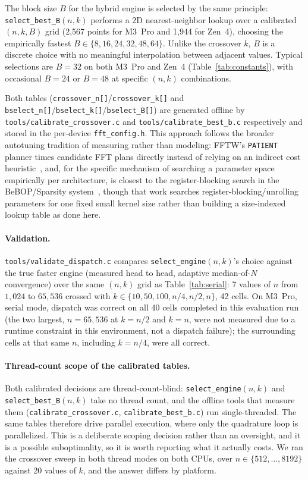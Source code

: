 \documentclass[11pt]{article}
\begin{document}
The block size $B$ for the hybrid engine is selected by the same principle:
\texttt{select\_best\_B}$(n,k)$ performs a 2D nearest-neighbor lookup over
a calibrated $(n,k,B)$ grid (2,567 points for M3~Pro and 1,944 for Zen~4), choosing the
empirically fastest $B \in \{8, 16, 24, 32, 48, 64\}$.  Unlike the
crossover $k$, $B$ is a discrete choice with no meaningful interpolation
between adjacent values.  Typical selections are $B = 32$ on both M3~Pro
and Zen~4 (Table~\ref{tab:constants}), with occasional $B = 24$ or $B = 48$ at specific $(n,k)$
combinations.

Both tables (\texttt{crossover\_n[]}/\texttt{crossover\_k[]} and
\texttt{bselect\_n[]}/\texttt{bselect\_k[]}/\texttt{bselect\_B[]}) are
generated offline by \texttt{tools/calibrate\_crossover.c} and
\texttt{tools/calibrate\_best\_b.c} respectively and stored in the
per-device \texttt{fft\_config.h}.  This approach follows the broader
autotuning tradition of measuring rather than modeling: FFTW's
\texttt{PATIENT} planner times candidate FFT plans directly instead of
relying on an indirect cost heuristic~\citep{frigo2005}, and, for the
specific mechanism of searching a parameter space empirically per
architecture, is closest to the register-blocking search in the
BeBOP/Sparsity system~\citep{demmel2004}, though that work searches
register-blocking/unrolling parameters for one fixed small kernel size
rather than building a size-indexed lookup table as done here.

\paragraph{Validation.}
\texttt{tools/validate\_dispatch.c} compares
\texttt{select\_engine}\allowbreak$(n,k)$'s choice against the true faster engine
(measured head to head, adaptive median-of-$N$ convergence) over the same
$(n,k)$ grid as Table~\ref{tab:serial}: 7 values of $n$ from $1{,}024$
to $65{,}536$ crossed with $k \in \{10, 50, 100, n/4, n/2, n\}$, 42 cells.
On M3~Pro, serial mode, dispatch was correct on all 40 cells completed in
this evaluation run (the two largest, $n=65{,}536$ at $k=n/2$ and $k=n$,
were not measured due to a runtime constraint in this environment, not a
dispatch failure); the surrounding cells at that same $n$, including
$k=n/4$, were all correct.

\paragraph{Thread-count scope of the calibrated tables.}
Both calibrated decisions are thread-count-blind:
\texttt{select\_engine}\allowbreak$(n,k)$ and
\texttt{select\_best\_B}\allowbreak$(n,k)$ take no thread count, and the
offline tools that measure them (\texttt{calibrate\_crossover.c},
\texttt{calibrate\_best\_b.c}) run single-threaded. The same tables
therefore drive parallel execution, where only the quadrature loop is
parallelized. This is a deliberate scoping decision rather than an
oversight, and it is a possible suboptimality, so it is worth reporting
what it actually costs. We ran the crossover sweep in both thread modes on
both CPUs, over $n \in \{512, \ldots, 8192\}$ against 20 values of $k$, and
the answer differs by platform.
\end{document}
